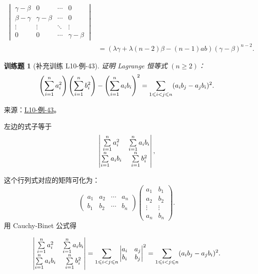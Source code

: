 \documentclass[UTF8,12pt,a4paper,fontset=fandol]{ctexart}
\newtheorem{exercise}{训练题}[section]
\begin{document}
\begin{solve}
\begin{align*}
\begin{vmatrix}
                                               \gamma-\beta & 0            & \cdots & 0            \\
                                               \beta-\gamma & \gamma-\beta & \cdots & 0            \\
                                               \vdots       & \vdots       & \ddots & \vdots       \\
                                               0            & 0            & \cdots & \gamma-\beta
                                           \end{vmatrix}           \\
                    & =(\lambda \gamma+\lambda(n-2)\beta-(n-1)ab)(\gamma-\beta)^{n-2}.
            \end{align*}
\end{solve}

\begin{exercise}[补充训练 L10-例-43]\label{prob:L10-例-43}
证明 Lagrange 恒等式 $(n \geqslant 2)$：
    \[ \left( \sum_{i=1}^{n}\limits a_i^2 \right) \left( \sum_{i=1}^{n}\limits b_i^2 \right) - \left( \sum_{i=1}^{n}\limits a_i b_i \right)^2 = \sum_{1 \leqslant i < j \leqslant n} (a_i b_j - a_j b_i)^2. \]
\end{exercise}
\noindent 来源：\href{https://github.com/yhwu-is/Linear-Algebra-Left-Undone/blob/new/%E8%AE%B2%E4%B9%89/%E4%B8%93%E9%A2%98/10%20%E8%A1%8C%E5%88%97%E5%BC%8F.tex}{L10-例-43}。
\begin{solve}
左边的式子等于
    \[ \begin{vmatrix}
        \sum_{i=1}^{n}\limits a_i^2 & \sum_{i=1}^{n}\limits a_i b_i \\
        \sum_{i=1}^{n}\limits a_i b_i & \sum_{i=1}^{n}\limits b_i^2
    \end{vmatrix}, \]

    这个行列式对应的矩阵可化为：
    \[ \begin{pmatrix}
        a_1 & a_2 & \cdots & a_n \\
        b_1 & b_2 & \cdots & b_n
    \end{pmatrix}
    \begin{pmatrix}
        a_1 & b_1 \\
        a_2 & b_2 \\
        \vdots & \vdots \\
        a_n & b_n
    \end{pmatrix}. \]
    用 Cauchy-Binet 公式得

    \[
    \begin{vmatrix}
        \sum_{i=1}^{n}\limits a_i^2 & \sum_{i=1}^{n}\limits a_i b_i \\
        \sum_{i=1}^{n}\limits a_i b_i & \sum_{i=1}^{n}\limits b_i^2
    \end{vmatrix}
    = \sum_{1 \leqslant i < j \leqslant n}
    \begin{vmatrix}
        a_i & a_j \\
        b_i & b_j
    \end{vmatrix}^2
    = \sum_{1 \leqslant i < j \leqslant n} (a_i b_j - a_j b_i)^2.
    \]
\end{solve}
\end{document}
